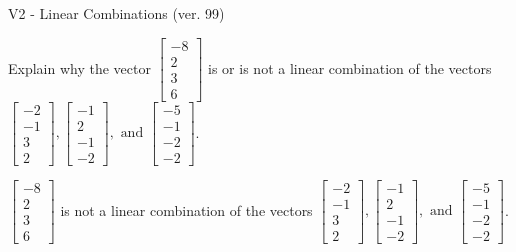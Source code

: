 \begin{exercise}
  \begin{exerciseTitle}V2 - Linear Combinations (ver. 99)\end{exerciseTitle}
  \begin{exerciseStatement}
    Explain why the vector \(\left[\begin{array}{c}
-8 \\
2 \\
3 \\
6
\end{array}\right]\)  is or is not a linear 
	combination of the vectors \(\left[\begin{array}{c}
-2 \\
-1 \\
3 \\
2
\end{array}\right] , \left[\begin{array}{c}
-1 \\
2 \\
-1 \\
-2
\end{array}\right] , \text{ and } \left[\begin{array}{c}
-5 \\
-1 \\
-2 \\
-2
\end{array}\right]\).
	


  \end{exerciseStatement}
  \begin{exerciseAnswer}
   \(\left[\begin{array}{c}
-8 \\
2 \\
3 \\
6
\end{array}\right]\) 
  	 is not  
	a linear combination of the vectors \(\left[\begin{array}{c}
-2 \\
-1 \\
3 \\
2
\end{array}\right] , \left[\begin{array}{c}
-1 \\
2 \\
-1 \\
-2
\end{array}\right] , \text{ and } \left[\begin{array}{c}
-5 \\
-1 \\
-2 \\
-2
\end{array}\right]\).

	
  


  \end{exerciseAnswer}
\end{exercise}